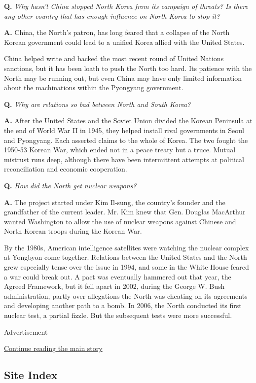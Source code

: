 \textbf{Q.} \emph{Why hasn't China stopped North Korea from its campaign
of threats? Is there any other country that has enough influence on
North Korea to stop it?}

\textbf{A.} China, the North's patron, has long feared that a collapse
of the North Korean government could lead to a unified Korea allied with
the United States.

China helped write and backed the most recent round of United Nations
sanctions, but it has been loath to push the North too hard. Its
patience with the North may be running out, but even China may have only
limited information about the machinations within the Pyongyang
government.

\textbf{Q.} \emph{Why are relations so bad between North and South
Korea?}

\textbf{A.} After the United States and the Soviet Union divided the
Korean Peninsula at the end of World War II in 1945, they helped install
rival governments in Seoul and Pyongyang. Each asserted claims to the
whole of Korea. The two fought the 1950-53 Korean War, which ended not
in a peace treaty but a truce. Mutual mistrust runs deep, although there
have been intermittent attempts at political reconciliation and economic
cooperation.

\textbf{Q.} \emph{How did the North get nuclear weapons?}

\textbf{A.} The project started under Kim Il-sung, the country's founder
and the grandfather of the current leader. Mr. Kim knew that Gen.
Douglas MacArthur wanted Washington to allow the use of nuclear weapons
against Chinese and North Korean troops during the Korean War.

By the 1980s, American intelligence satellites were watching the nuclear
complex at Yongbyon come together. Relations between the United States
and the North grew especially tense over the issue in 1994, and some in
the White House feared a war could break out. A pact was eventually
hammered out that year, the Agreed Framework, but it fell apart in 2002,
during the George W. Bush administration, partly over allegations the
North was cheating on its agreements and developing another path to a
bomb. In 2006, the North conducted its first nuclear test, a partial
fizzle. But the subsequent tests were more successful.

Advertisement

\protect\hyperlink{after-bottom}{Continue reading the main story}

\hypertarget{site-index}{%
\subsection{Site Index}\label{site-index}}

